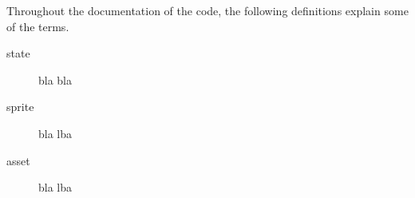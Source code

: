 
Throughout the documentation of the code, the following definitions explain
some of the terms.


\begin{description}
    \item[state]{bla bla}
    \item[sprite]{bla lba}
    \item[asset]{bla lba}
\end{description}
